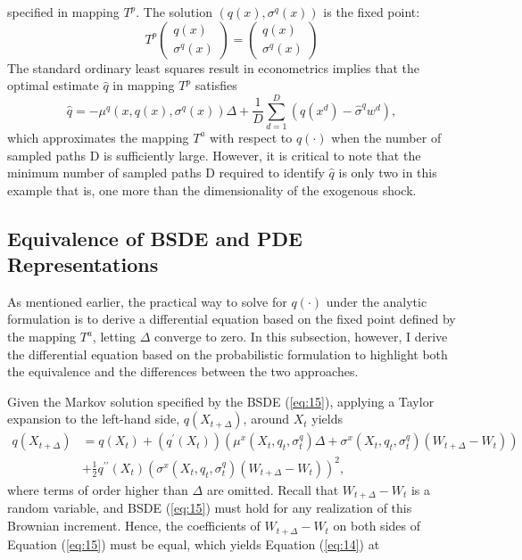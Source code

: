 \documentclass{article}
\begin{document}
specified in mapping $T^p$. The solution $(q(x), \sigma^{q}(x))$ is the fixed point:
\[
T^{p}\begin{pmatrix}q(x)\\ \sigma^{q}(x)\end{pmatrix}=\begin{pmatrix}q(x)\\ \sigma^{q}(x)\end{pmatrix}
\]
The standard ordinary least squares result in econometrics implies that the optimal estimate $\hat{q}$ in mapping $T^p$ satisfies
\[
\hat{q}=-\mu^{q}(x,q(x),\sigma^{q}(x))\Delta+\frac{1}{D}\sum_{d=1}^{D}(q(x^{d})-\hat{\sigma}^{q}w^{d}),
\]
which approximates the mapping $T^{a}$ with respect to $q(\cdot)$ when the number of sampled paths D is sufficiently large. However, it is critical to note that the minimum number of sampled paths D required to identify $\hat{q}$ is only two in this example that is, one more than the dimensionality of the exogenous shock.

\subsection{Equivalence of BSDE and PDE Representations}

As mentioned earlier, the practical way to solve for $q(\cdot)$ under the analytic formulation is to derive a differential equation based on the fixed point defined by the mapping $T^{a}$, letting $\Delta$ converge to zero. In this subsection, however, I derive the differential equation based on the probabilistic formulation to highlight both the equivalence and the differences between the two approaches.

Given the Markov solution specified by the BSDE (\ref{eq:15}), applying a Taylor expansion to the left-hand side, $q(X_{t+\Delta})$, around $X_{t}$ yields
\begin{align*}
q(X_{t+\Delta})&=q(X_{t})+(q^{\prime}(X_{t}))(\mu^{x}(X_{t},q_{t},\sigma_{t}^{q})\Delta+\sigma^{x}(X_{t},q_{t},\sigma_{t}^{q})(W_{t+\Delta}-W_{t})) \\
&+\frac{1}{2}q^{\prime\prime}(X_{t})(\sigma^{x}(X_{t},q_{t},\sigma_{t}^{q})(W_{t+\Delta}-W_{t}))^{2},
\end{align*}
where terms of order higher than $\Delta$ are omitted. Recall that $W_{t+\Delta}-W_{t}$ is a random variable, and BSDE (\ref{eq:15}) must hold for any realization of this Brownian increment. Hence, the coefficients of $W_{t+\Delta}-W_{t}$ on both sides of Equation (\ref{eq:15}) must be equal, which yields Equation (\ref{eq:14}) at
\end{document}
